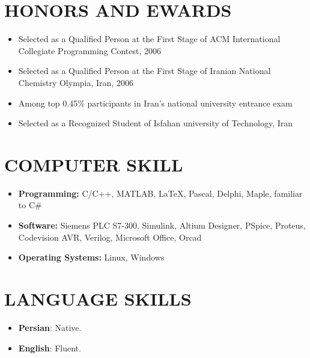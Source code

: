 \documentclass[margin,11pt]{res}
\begin{document}
\begin{resume}
\begin{itemize}
\end{itemize}
 
\section{HONORS AND EWARDS}
\begin{itemize}

					\item
						Selected as a Qualified Person at the First Stage of ACM International Collegiate Programming Contest, 2006
					\item 
						Selected as a Qualified Person at the First Stage of Iranian National Chemistry Olympia,
Iran, 2006
					\item 
						Among top 0.45\% participants in Iran’s national university entrance exam

\item Selected as a Recognized Student of Isfahan university of Technology, Iran						
\end{itemize}
\section{COMPUTER SKILL}
\begin{itemize}
\item {\bf Programming:} C/C++, MATLAB, \LaTeX, Pascal, Delphi,  Maple, familiar to  C\#
\item {\bf Software:} Siemens PLC S7-300, Simulink, Altium Designer, PSpice, Proteus, Codevision AVR, Verilog, Microsoft Office, Orcad
\item {\bf Operating Systems:} Linux, Windows
\end{itemize}
\section{LANGUAGE SKILLS}
\begin{itemize}
\item
{\bf Persian}: Native.
\item
{\bf English}: Fluent.


\end{itemize}
\end{resume}
\end{document}
